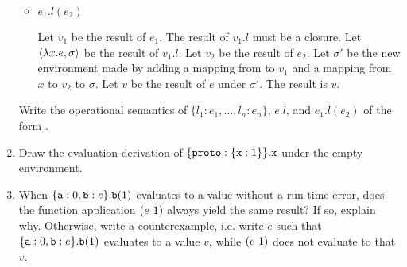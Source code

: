 \begin{exercise}
\begin{enumerate}
\begin{itemize}
      \item $e_1.l(e_2)$

        Let $v_1$ be the result of $e_1$.  The result of $v_1.l$ must be a
        closure. Let $\langle\lambda x.e,\sigma\rangle$ be the result of $v_1.l$.  Let $v_2$
        be the result of $e_2$.  Let $\sigma'$ be the new environment made by
        adding a mapping from  to $v_1$ and a mapping from $x$ to
        $v_2$ to $\sigma$.  Let $v$ be the result of $e$ under $\sigma'$.  The
        result is $v$.

    \end{itemize}
    Write the operational semantics of $\{l_1:e_1,\ldots,l_n:e_n\}$, $e.l$, and
    $e_1.l(e_2)$ of the form .

  \item Draw the evaluation derivation of $\{\texttt{proto}:\{\texttt{x}:1\}\}.\texttt{x}$ under
    the empty environment.

  \item
    When $\{ \texttt{a}:0, \texttt{b}:e \}.\texttt{b}(1)$ evaluates to a value without a run-time
    error, does the function
    application $(e\ 1)$ always yield the same result? If so, explain why. Otherwise,
    write a counterexample, i.e. write $e$ such that
    $\{ \texttt{a}:0, \texttt{b}:e \}.\texttt{b}(1)$ evaluates to a value $v$, while
    $(e\ 1)$ does not evaluate to that $v$.

\end{enumerate}

\end{exercise}

